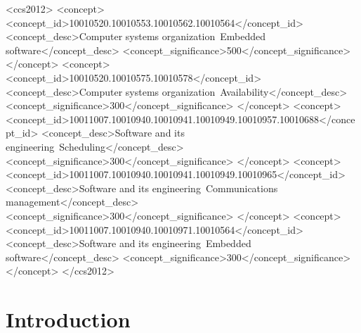 \documentclass[acmsmall,review,anonymous]{acmart}\settopmatter{printfolios=true,printccs=false,printacmref=false}
\begin{document}
\renewcommand{\shortauthors}{A. Y. Majid et al.}

\begin{abstract}
	


\end{abstract}


\begin{CCSXML}
	<ccs2012>
	<concept>
	<concept_id>10010520.10010553.10010562.10010564</concept_id>
	<concept_desc>Computer systems organization~Embedded 
	software</concept_desc>
	<concept_significance>500</concept_significance>
	</concept>
	<concept>
	<concept_id>10010520.10010575.10010578</concept_id>
	<concept_desc>Computer systems organization~Availability</concept_desc>
	<concept_significance>300</concept_significance>
	</concept>
	<concept>
	<concept_id>10011007.10010940.10010941.10010949.10010957.10010688</concept_id>
	<concept_desc>Software and its engineering~Scheduling</concept_desc>
	<concept_significance>300</concept_significance>
	</concept>
	<concept>
	<concept_id>10011007.10010940.10010941.10010949.10010965</concept_id>
	<concept_desc>Software and its engineering~Communications 
	management</concept_desc>
	<concept_significance>300</concept_significance>
	</concept>
	<concept>
	<concept_id>10011007.10010940.10010971.10010564</concept_id>
	<concept_desc>Software and its engineering~Embedded 
	software</concept_desc>
	<concept_significance>300</concept_significance>
	</concept>
	</ccs2012>
\end{CCSXML}



\maketitle

\section{Introduction}
\label{sec:intro}
\end{document}
